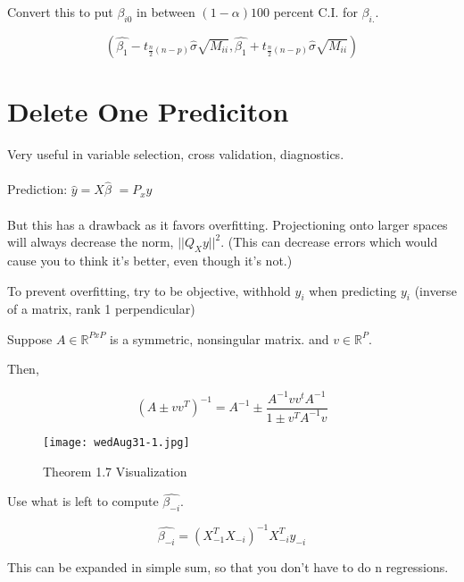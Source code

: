 \documentclass[11pt,fleqn]{book} %
\begin{document}
Convert this to put $\beta_{i0}$ in between $(1-\alpha)100$ percent C.I. for $\beta_{i.}$. 

$$(\hat{\beta_1} - t_{\frac{n}{2}(n-p)} \hat{\sigma} \sqrt{M_{ii}}, \hat{\beta_1} + t_{\frac{n}{2}(n-p)} \hat{\sigma} \sqrt{M_{ii}}) $$


\section{Delete One Prediciton}

Very useful in variable selection, cross validation, diagnostics.\\
\\ 
Prediction: $\hat{y} = X \hat{\beta}$
	$= P_x y$\\
\\
But this has a drawback as it favors overfitting. Projectioning onto larger spaces will always decrease the norm,  $||Q_Xy ||^2$. (This can decrease errors which would cause you to think it's better, even though it's not.)

To prevent overfitting, try to be objective, withhold $y_i$ when predicting $y_i$ (inverse of a matrix, rank 1 perpendicular)

\begin{theorem}[Theorem 1.7]
	Suppose $A \in \mathbb{R}^{PxP}$ is a symmetric, nonsingular matrix. and $v \in \mathbb{R}^P$. 

	Then, 

	$$(A \pm vv^T)^{-1} = A^{-1} \pm \frac{A^{-1}vv^t A^{-1}}{1 \pm v^TA^{-1}v}$$
\end{theorem}

\begin{figure}[h]
	\centering\texttt{[image: wedAug31-1.jpg]}
	\caption{Theorem 1.7 Visualization}
	\end{figure}

Use what is left to compute $\hat{\beta_{-i}}$.

$$\hat{\beta_{-i}} = (X^T_{-1}X_{-i})^{-1}X^T_{-i} y_{-i}$$

This can be expanded in simple sum, so that you don't have to do n regressions.
\end{document}
